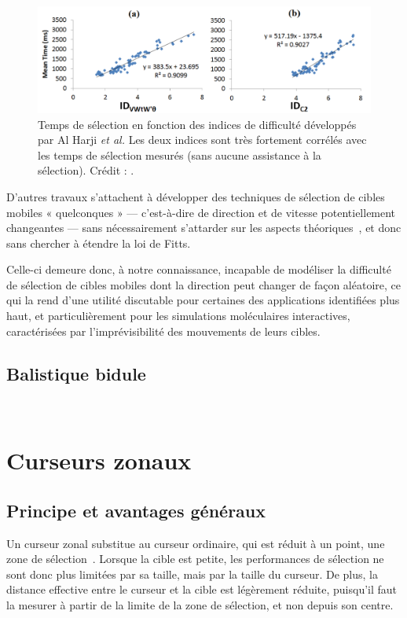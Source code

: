 	\begin{figure}[H]
		\centering
		\includegraphics[width=\textwidth]{figures/ch2/holdID}
		\caption[Indice de difficulté en fonction de la nature du mouvement et temps de sélection]{Temps de sélection en fonction des indices de difficulté développés par Al Harji \emph{et al.} Les deux indices sont très fortement corrélés avec les temps de sélection mesurés (sans aucune assistance à la sélection). Crédit : \cite{hajri2011moving}.}
		\label{fig:holdID}
	\end{figure}
	
	D'autres travaux s'attachent à développer des techniques de sélection de cibles mobiles « quelconques » --- c'est-à-dire de direction et de vitesse potentiellement changeantes --- sans nécessairement s'attarder sur les aspects théoriques~\cite{hasan2011comet, ortega2013hook}, et donc sans chercher à étendre la loi de Fitts.
	
	Celle-ci demeure donc, à notre connaissance, incapable de modéliser la difficulté de sélection de cibles mobiles dont la direction peut changer de façon aléatoire, ce qui la rend d'une utilité discutable pour certaines des applications identifiées plus haut, et particulièrement pour les simulations moléculaires interactives, caractérisées par l'imprévisibilité des mouvements de leurs cibles.
	\subsection{Balistique bidule}
	~\cite{woodworth1899accuracy, plamondon1997speed}

\section{Curseurs zonaux}
	\subsection{Principe et avantages généraux}
	Un curseur zonal substitue au curseur ordinaire, qui est réduit à un point, une zone de sélection~\cite{kabbash1995prince, worden1997making}. Lorsque la cible est petite, les performances de sélection ne sont donc plus limitées par sa taille, mais par la taille du curseur. De plus, la distance effective entre le curseur et la cible est légèrement réduite, puisqu'il faut la mesurer à partir de la limite de la zone de sélection, et non depuis son centre.
	
